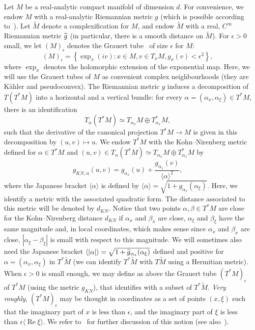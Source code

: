 \documentclass[AHL,Unicode,longabstracts,published]{cedram}
\DeclareMathOperator{\re}{Re}
\newcommand{\set}[1]{\left\{ #1 \right\}}
\newcommand{\va}[1]{\left|#1\right|}
\newcommand{\brac}[1]{\langle #1 \rangle}
\let\oldtilde\tilde
\renewcommand*{\tilde}[1]{\mathchoice{\widetilde{#1}}{\widetilde{#1}}{\oldtilde{#1}}{\oldtilde{#1}}}
\begin{document}
Let $M$ be a real-analytic compact manifold of dimension $d$. For convenience, we endow $M$ with a real-analytic Riemannian metric $g$ (which is possible according to~\cite{morrey_embedding}). Let $\widetilde{M}$ denote a complexification for $M$, and endow $\widetilde{M}$ with a real, $C^\infty$ Riemannian metric $\tilde{g}$ (in particular, there is a smooth distance on $\widetilde{M}$). For $\epsilon > 0$ small, we let $(M)_\epsilon$ denotes the Grauert tube~\cite{grauert_tube_I,grauert_tube_II} of size $\epsilon$ for $M$:
\begin{equation*}
(M)_\epsilon = \set{\exp_x(iv) : x \in M, v \in T_x M, g_x(v) < \epsilon^2},
\end{equation*}
where $\exp_x$ denotes the holomorphic extension of the exponential map. Here, we will use the Grauert tubes of $M$ as convenient complex neighbourhoods (they are Kähler and pseudoconvex). The Riemannian metric $g$ induces a decomposition of $T(T^* M)$ into a horizontal and a vertical bundle: for every $\alpha = (\alpha_x,\alpha_\xi) \in T^* M$, there is an identification
\begin{equation*}
T_\alpha(T^* M) \simeq T_{\alpha_x} M \oplus T_{\alpha_x}^* M,
\end{equation*}
such that the derivative of the canonical projection $T^* M \to M$ is given in this decomposition by $(u,v) \mapsto u$. We endow $T^* M$ with the Kohn--Nirenberg metric defined for $\alpha \in T^* M$ and $(u,v) \in T_\alpha(T^* M) \simeq T_{\alpha_x} M \oplus T_{\alpha_x}^* M$ by
\begin{equation*}
g_{KN,\alpha}(u,v) = g_{\alpha_x}(u) + \frac{g_{\alpha_x}(v)}{\brac{\alpha}^2},
\end{equation*}
where the Japanese bracket $\brac{\alpha}$ is defined by $\brac{\alpha} = \sqrt{1 + g_{\alpha_x}(\alpha_\xi)}$. Here, we identify a metric with the associated quadratic form. The distance associated to this metric will be denoted by $d_{KN}$. Notice that two points $\alpha,\beta \in T^* M$ are close for the Kohn--Nirenberg distance $d_{KN}$ if $\alpha_x$ and $\beta_x$ are close, $\alpha_\xi$ and $\beta_\xi$ have the same magnitude and, in local coordinates, which makes sense since $\alpha_x$ and $\beta_x$ are close, $|\alpha_\xi - \beta_\xi|$ is small with respect to this magnitude. We will sometimes also need the Japanese bracket $\brac{\va{\alpha}} = \sqrt{1 + \tilde{g}_{\alpha_x}(\alpha_\xi)}$ defined and positive for $\alpha= (\alpha_x,\alpha_\xi)$ in $T^* \widetilde{M}$ (we can identify $T^* \widetilde{M}$ with $T \widetilde{M}$ using a Hermitian metric). When $\epsilon > 0$ is small enough, we may define as above the Grauert tube $(T^* M)_\epsilon$ of $T^* M$ (using the metric $g_{KN}$), that identifies with a subset of $T^* \widetilde{M}$. \emph{Very roughly}, $(T^* M)_{\epsilon}$ may be thought in coordinates as a set of points $(x,\xi)$ such that the imaginary part of $x$ is less than $\epsilon$, and the imaginary part of $\xi$ is less than $\epsilon \brac{\re \xi}$. We refer to~\cite[\S~1.1.1.2]{BJ20} for further discussion of this notion (see also~\cite[\S~5.1]{upper_bound_resonances}).
\end{document}
